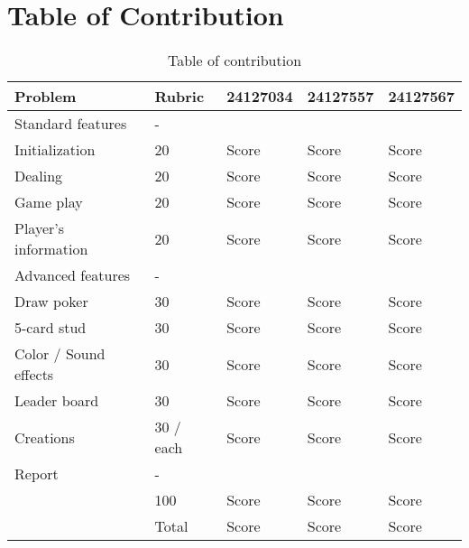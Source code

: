 \section{Table of Contribution}
\label{sec:table-of-contribution}

\renewcommand{\arraystretch}{1.5} %
\begin{table}[ht]
    \centering
    \begin{tabular}{|m{4cm}|m{2cm}|m{2cm}|m{2cm}| m{2cm}|}
    \hline
    \textbf{Problem} & \textbf{Rubric} & \textbf{24127034} & \textbf{24127557} & \textbf{24127567} \\
    \hline
    Standard features & - &  &  &  \\
    \hline
    Initialization & 20 & Score & Score & Score \\
    \hline
    Dealing & 20 & Score & Score & Score \\
    \hline 
    Game play & 20 & Score & Score & Score \\
    \hline
    Player's information & 20 & Score & Score & Score \\
    \hline
    Advanced features & - &  &  &  \\
    \hline 
    Draw poker & 30 & Score & Score & Score \\
    \hline
    5-card stud & 30 & Score & Score & Score \\
    \hline
    Color / Sound effects & 30 & Score & Score & Score \\
    \hline
    Leader board & 30 & Score & Score & Score \\
    \hline
    Creations & 30 / each & Score & Score & Score \\
    \hline
    Report & - &  &  &  \\
    \hline
     & 100 & Score & Score & Score \\
    \hline
    & Total & Score & Score & Score \\
    \hline
    \end{tabular}
    \caption{Table of contribution}
    \label{tab:table-of-contribution}

\end{table}